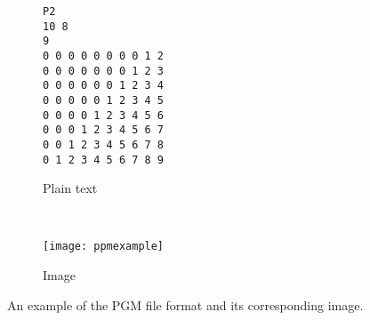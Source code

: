 \begin{figure}[h]
\centering
\begin{subfigure}[b]{0.4\textwidth}
\begin{minipage}{1\textwidth}
\begin{lstlisting}[label = li:ppmformat]
P2
10 8
9
0 0 0 0 0 0 0 0 1 2
0 0 0 0 0 0 0 1 2 3
0 0 0 0 0 0 1 2 3 4
0 0 0 0 0 1 2 3 4 5
0 0 0 0 1 2 3 4 5 6
0 0 0 1 2 3 4 5 6 7
0 0 1 2 3 4 5 6 7 8
0 1 2 3 4 5 6 7 8 9
\end{lstlisting}
\end{minipage}
\caption{
    \tiny Plain text
  }
  \label{fig:ppmplain}
\end{subfigure}
~ %
\begin{subfigure}[b]{0.45\textwidth}
  \centering
  \texttt{[image: ppmexample]}
  \caption{
    \tiny Image
  }
  \label{fig:ppmimage}
\end{subfigure}
\caption{
    An example of the PGM file format and its corresponding image.
}
\end{figure}

